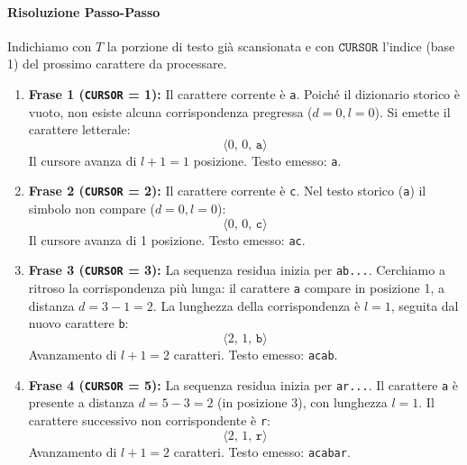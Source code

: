 \paragraph{Risoluzione Passo-Passo}
Indichiamo con $T$ la porzione di testo gi\`a scansionata e con $\texttt{CURSOR}$ l'indice (base 1) del prossimo carattere da processare.

\begin{enumerate}
  \item \textbf{Frase 1 (\texttt{CURSOR} = 1):} Il carattere corrente \`e \texttt{a}. Poich\'e il dizionario storico \`e vuoto, non esiste alcuna corrispondenza pregressa ($d=0, l=0$). Si emette il carattere letterale:
  \begin{equation*}
    \langle 0, \, 0, \, \texttt{a} \rangle
  \end{equation*}
  Il cursore avanza di $l + 1 = 1$ posizione. Testo emesso: \texttt{a}.

  \item \textbf{Frase 2 (\texttt{CURSOR} = 2):} Il carattere corrente \`e \texttt{c}. Nel testo storico (\texttt{a}) il simbolo non compare ($d=0, l=0$):
  \begin{equation*}
    \langle 0, \, 0, \, \texttt{c} \rangle
  \end{equation*}
  Il cursore avanza di 1 posizione. Testo emesso: \texttt{ac}.

  \item \textbf{Frase 3 (\texttt{CURSOR} = 3):} La sequenza residua inizia per \texttt{ab...}. Cerchiamo a ritroso la corrispondenza pi\`u lunga: il carattere \texttt{a} compare in posizione 1, a distanza $d = 3 - 1 = 2$. La lunghezza della corrispondenza \`e $l = 1$, seguita dal nuovo carattere \texttt{b}:
  \begin{equation*}
    \langle 2, \, 1, \, \texttt{b} \rangle
  \end{equation*}
  Avanzamento di $l + 1 = 2$ caratteri. Testo emesso: \texttt{acab}.

  \item \textbf{Frase 4 (\texttt{CURSOR} = 5):} La sequenza residua inizia per \texttt{ar...}. Il carattere \texttt{a} \`e presente a distanza $d = 5 - 3 = 2$ (in posizione 3), con lunghezza $l = 1$. Il carattere successivo non corrispondente \`e \texttt{r}:
  \begin{equation*}
    \langle 2, \, 1, \, \texttt{r} \rangle
  \end{equation*}
  Avanzamento di $l + 1 = 2$ caratteri. Testo emesso: \texttt{acabar}.


\end{enumerate}
